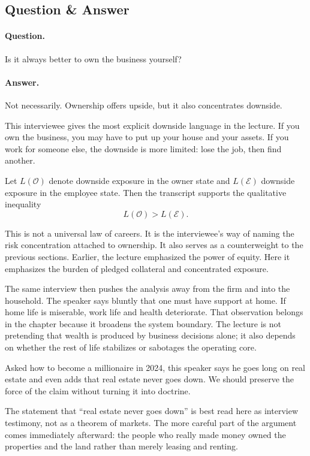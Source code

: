 \subsection{Question \& Answer}

\paragraph{Question.} Is it always better to own the business yourself?

\paragraph{Answer.} Not necessarily. Ownership offers upside, but it also concentrates downside.

This interviewee gives the most explicit downside language in the lecture. If you own the business, you may have to put up your house and your assets. If you work for someone else, the downside is more limited: lose the job, then find another.

Let \(L(\mathcal{O})\) denote downside exposure in the owner state and \(L(\mathcal{E})\) downside exposure in the employee state. Then the transcript supports the qualitative inequality
\begin{equation}
L(\mathcal{O}) > L(\mathcal{E}).
\end{equation}

This is not a universal law of careers. It is the interviewee's way of naming the risk concentration attached to ownership. It also serves as a counterweight to the previous sections. Earlier, the lecture emphasized the power of equity. Here it emphasizes the burden of pledged collateral and concentrated exposure.

The same interview then pushes the analysis away from the firm and into the household. The speaker says bluntly that one must have support at home. If home life is miserable, work life and health deteriorate. That observation belongs in the chapter because it broadens the system boundary. The lecture is not pretending that wealth is produced by business decisions alone; it also depends on whether the rest of life stabilizes or sabotages the operating core.

Asked how to become a millionaire in 2024, this speaker says he goes long on real estate and even adds that real estate never goes down. We should preserve the force of the claim without turning it into doctrine.

\begin{remark}
The statement that ``real estate never goes down'' is best read here as interview testimony, not as a theorem of markets. The more careful part of the argument comes immediately afterward: the people who really made money owned the properties and the land rather than merely leasing and renting.
\end{remark}

